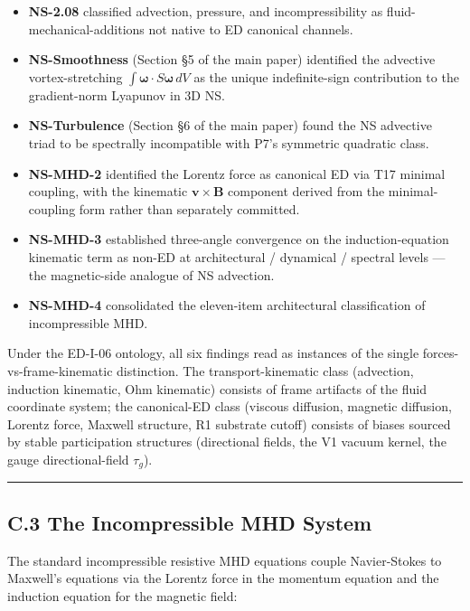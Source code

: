 \documentclass[
  11pt,a4paper]{article}
\providecommand{\tightlist}{%
  \setlength{\itemsep}{0pt}\setlength{\parskip}{0pt}}
\begin{document}
\begin{itemize}
\tightlist
\item
  \textbf{NS-2.08} classified advection, pressure, and incompressibility
  as fluid-mechanical-additions not native to ED canonical channels.
\item
  \textbf{NS-Smoothness} (Section §5 of the main paper) identified the
  advective vortex-stretching
  \(\int\boldsymbol{\omega}\cdot S\boldsymbol{\omega}\,dV\) as the
  unique indefinite-sign contribution to the gradient-norm Lyapunov in
  3D NS.
\item
  \textbf{NS-Turbulence} (Section §6 of the main paper) found the NS
  advective triad to be spectrally incompatible with P7's symmetric
  quadratic class.
\item
  \textbf{NS-MHD-2} identified the Lorentz force as canonical ED via T17
  minimal coupling, with the kinematic \(\mathbf{v}\times\mathbf{B}\)
  component derived from the minimal-coupling form rather than
  separately committed.
\item
  \textbf{NS-MHD-3} established three-angle convergence on the
  induction-equation kinematic term as non-ED at architectural /
  dynamical / spectral levels --- the magnetic-side analogue of NS
  advection.
\item
  \textbf{NS-MHD-4} consolidated the eleven-item architectural
  classification of incompressible MHD.
\end{itemize}

Under the ED-I-06 ontology, all six findings read as instances of the
single forces-vs-frame-kinematic distinction. The transport-kinematic
class (advection, induction kinematic, Ohm kinematic) consists of frame
artifacts of the fluid coordinate system; the canonical-ED class
(viscous diffusion, magnetic diffusion, Lorentz force, Maxwell
structure, R1 substrate cutoff) consists of biases sourced by stable
participation structures (directional fields, the V1 vacuum kernel, the
gauge directional-field \(\tau_g\)).

\begin{center}\rule{0.5\linewidth}{0.5pt}\end{center}

\subsection{C.3 The Incompressible MHD
System}\label{c.3-the-incompressible-mhd-system}

The standard incompressible resistive MHD equations couple Navier-Stokes
to Maxwell's equations via the Lorentz force in the momentum equation
and the induction equation for the magnetic field:
\end{document}
